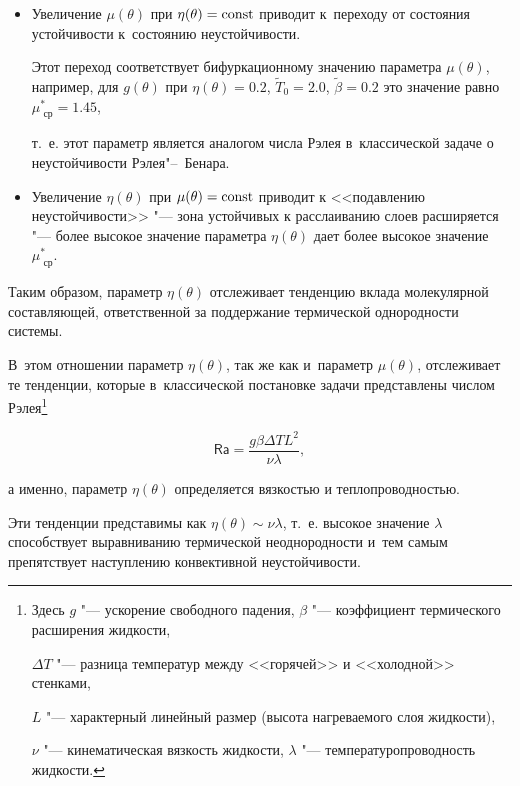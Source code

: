 \begin{itemize}

\item[1.] Увеличение $\mu(\theta)$ при $\eta(\theta)={\rm const}$ приводит к~переходу от состояния устойчивости к~состоянию неустойчивости. 

Этот переход соответствует бифуркационному значению параметра $\mu(\theta)$, например, для $g(\theta)$ при $\eta(\theta)=0.2$, $\widetilde{T}_0=2.0$, $\widetilde{\beta}=0.2$ это значение равно $\mu^*_{\text{ ср}}=1.45$, 

т.~е. этот параметр является аналогом числа Рэлея в~классической задаче о неустойчивости Рэлея"--~Бенара.



\item[2.] Увеличение $\eta(\theta)$ при $\mu(\theta)={\rm const}$ приводит к <<подавлению неустойчивости>> "--- зона устойчивых к расслаиванию слоев расширяется "--- более высокое значение параметра $\eta(\theta)$ дает более высокое значение $\mu^*_{\text{ ср}}$.



\end{itemize}





Таким образом, параметр $\eta(\theta)$ отслеживает тенденцию вклада молекулярной составляющей, ответственной за поддержание термической однородности системы. 

В~этом отношении параметр $\eta(\theta)$, так же как и~параметр $\mu(\theta)$, отслеживает те тенденции, которые в~классической постановке задачи представлены числом Рэлея\footnote{Здесь $g$ "--- ускорение свободного падения,  $\beta$ "--- коэффициент термического расширения жидкости, 

$\Delta T$ "--- разница температур между <<горячей>> и <<холодной>> стенками,  

$L$ "--- характерный линейный размер (высота нагреваемого слоя жидкости),  

$\nu$ "--- кинематическая вязкость жидкости, $\lambda$ "--- температуропроводность жидкости.} 

$$\mathsf{Ra}=\frac{g\beta \Delta T L^2}{\nu\lambda},$$ 

а именно, параметр  $\eta(\theta)$ определяется вязкостью и теплопроводностью. 

Эти тенденции представимы как $\eta(\theta)\sim \nu\lambda$, т.~е. высокое значение $\lambda$ способствует выравниванию термической неоднородности и~тем самым препятствует наступлению конвективной неустойчивости. 

